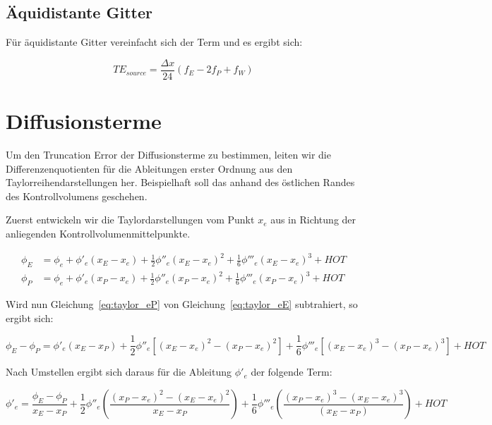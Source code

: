 \documentclass[10pt, ngerman,colorback,accentcolor=tud2d]{tudreport}
\begin{document}
\subsection{Äquidistante Gitter}

Für äquidistante Gitter vereinfacht sich der Term und es ergibt sich:

\begin{equation*}
  TE_{source} = \frac{\Delta x}{24} \left({f_E-2f_P+f_W}\right)
\end{equation*}

\section{Diffusionsterme}
\label{sec:Diffusionsterme}


Um den Truncation Error der Diffusionsterme zu bestimmen, leiten wir die Differenzenquotienten
für die Ableitungen erster Ordnung aus den Taylorreihendarstellungen her. Beispielhaft
soll das anhand des östlichen Randes des Kontrollvolumens geschehen.

Zuerst entwickeln wir die Taylordarstellungen vom Punkt $x_e$ aus in Richtung der anliegenden
Kontrollvolumenmittelpunkte.

\begin{align}
  \phi_E &= \phi_e + \phi'_e(x_E-x_e)+\frac{1}{2}\phi''_e(x_E-x_e)^2
  +\frac{1}{6}\phi'''_e(x_E-x_e)^3+HOT
  \label{eq:taylor_eE}\\
  \phi_P &= \phi_e + \phi'_e(x_P-x_e)+\frac{1}{2}\phi''_e(x_P-x_e)^2
  +\frac{1}{6}\phi'''_e(x_P-x_e)^3+HOT
  \label{eq:taylor_eP}
\end{align}

Wird nun Gleichung~\ref{eq:taylor_eP} von Gleichung~\ref{eq:taylor_eE} subtrahiert, 
so ergibt sich:

\begin{equation*}
  \phi_E-\phi_P=\phi'_e(x_E-x_P)+
  \frac{1}{2}\phi''_e\left[{{(x_E-x_e)}^2-{(x_P-x_e)}^2}\right]+
  \frac{1}{6}\phi'''_e\left[{{(x_E-x_e)}^3-{(x_P-x_e)}^3}\right]+HOT
\end{equation*}

Nach Umstellen ergibt sich daraus für die Ableitung $\phi'_e$ der folgende Term:

\begin{equation}
  \phi'_e = \frac{\phi_E-\phi_P}{x_E-x_P}+\frac{1}{2}\phi''_e
\left({\frac{{(x_P-x_e)}^2-{(x_E-x_e)}^2}{x_E-x_P}}\right)+
\frac{1}{6} \phi'''_e \left({\frac{{(x_P-x_e)}^3-{(x_E-x_e)}^3}{(x_E-x_P)}}\right)+HOT
\end{equation}
\end{document}
